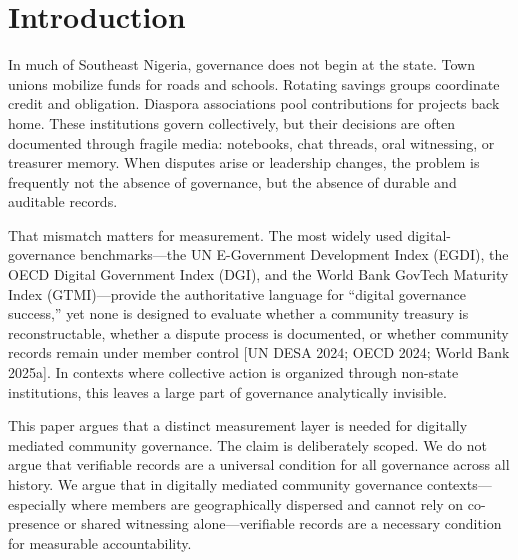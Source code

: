\documentclass[sigconf,anonymous]{acmart}
\begin{document}

\maketitle

\section{Introduction}

In much of Southeast Nigeria, governance does not begin at the state. Town unions mobilize funds for roads and schools. Rotating savings groups coordinate credit and obligation. Diaspora associations pool contributions for projects back home. These institutions govern collectively, but their decisions are often documented through fragile media: notebooks, chat threads, oral witnessing, or treasurer memory. When disputes arise or leadership changes, the problem is frequently not the absence of governance, but the absence of durable and auditable records.

That mismatch matters for measurement. The most widely used digital-governance benchmarks---the UN E-Government Development Index (EGDI), the OECD Digital Government Index (DGI), and the World Bank GovTech Maturity Index (GTMI)---provide the authoritative language for ``digital governance success,'' yet none is designed to evaluate whether a community treasury is reconstructable, whether a dispute process is documented, or whether community records remain under member control [UN DESA 2024; OECD 2024; World Bank 2025a]. In contexts where collective action is organized through non-state institutions, this leaves a large part of governance analytically invisible.

This paper argues that a distinct measurement layer is needed for digitally mediated community governance. The claim is deliberately scoped. We do not argue that verifiable records are a universal condition for all governance across all history. We argue that in digitally mediated community governance contexts---especially where members are geographically dispersed and cannot rely on co-presence or shared witnessing alone---verifiable records are a necessary condition for measurable accountability.
\end{document}
